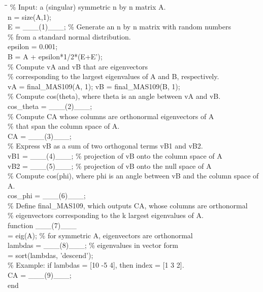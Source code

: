 \begin{problem}
{\small\ttfamily
\begin{tabbing}
\hspace{2em}\=\hspace{2em}\=\kill
\% Input: a (singular) symmetric n by n matrix A.\\
n = size(A,1);\\
E = \_\_\_(1)\_\_\_; \% Generate an n by n matrix with random numbers\\
\>\% from a standard normal distribution.\\
epsilon = 0.001;\\
B = A + epsilon*1/2*(E+E');\\[0.15em]
\% Compute vA and vB that are eigenvectors\\
\% corresponding to the largest eigenvalues of A and B, respectively.\\
vA = final\_MAS109(A, 1); vB = final\_MAS109(B, 1);\\[0.15em]
\% Compute cos(theta), where theta is an angle between vA and vB.\\
cos\_theta = \_\_\_(2)\_\_\_;\\[0.15em]
\% Compute CA whose columns are orthonormal eigenvectors of A\\
\% that span the column space of A.\\
CA = \_\_\_(3)\_\_\_;\\[0.15em]
\% Express vB as a sum of two orthogonal terms vB1 and vB2.\\
vB1 = \_\_\_(4)\_\_\_; \% projection of vB onto the column space of A\\
vB2 = \_\_\_(5)\_\_\_; \% projection of vB onto the null space of A\\[0.15em]
\% Compute cos(phi), where phi is an angle between vB and the column space of A.\\
cos\_phi = \_\_\_(6)\_\_\_;\\[0.35em]
\% Define final\_MAS109, which outputs CA, whose columns are orthonormal\\
\% eigenvectors corresponding to the k largest eigenvalues of A.\\
function \_\_\_(7)\_\_\_\\
\>[V, D] = eig(A); \% for symmetric A, eigenvectors are orthonormal\\
\>lambdas = \_\_\_(8)\_\_\_; \% eigenvalues in vector form\\
 = sort(lambdas, 'descend');\\
\>\% Example: if lambdas = [10 -5 4], then index = [1 3 2].\\
\>CA = \_\_\_(9)\_\_\_;\\
end
\end{tabbing}
}
\end{problem}

